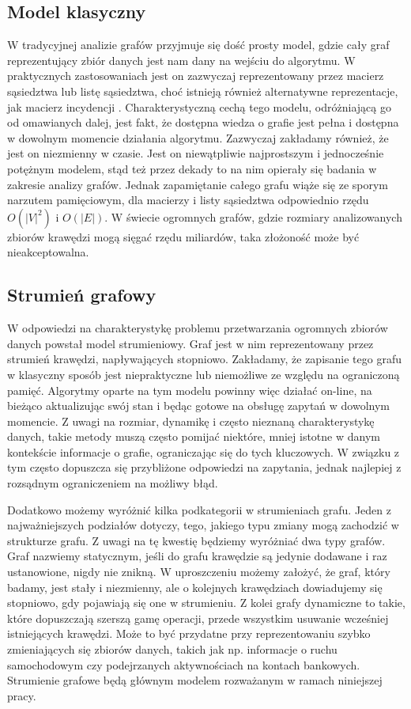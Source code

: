     \subsection{Model klasyczny}
        W tradycyjnej analizie grafów przyjmuje się dość prosty model, gdzie cały graf reprezentujący zbiór danych jest nam dany na wejściu do algorytmu. W praktycznych zastosowaniach jest on zazwyczaj reprezentowany przez macierz sąsiedztwa lub listę sąsiedztwa, choć istnieją również alternatywne reprezentacje, jak macierz incydencji \cite{Wilson_2015}. Charakterystyczną cechą tego modelu, odróżniającą go od omawianych dalej, jest fakt, że dostępna wiedza o grafie jest pełna i dostępna w dowolnym momencie działania algorytmu. Zazwyczaj zakładamy również, że jest on niezmienny w czasie. Jest on niewątpliwie najprostszym i jednocześnie potężnym modelem, stąd też przez dekady to na nim opierały się badania w zakresie analizy grafów. Jednak zapamiętanie całego grafu wiąże się ze sporym narzutem pamięciowym, dla macierzy i listy sąsiedztwa odpowiednio rzędu $O(|V|^2)$ i $O(|E|)$. W świecie ogromnych grafów, gdzie rozmiary analizowanych zbiorów krawędzi mogą sięgać rzędu miliardów, taka złożoność może być nieakceptowalna. 

    \subsection{Strumień grafowy}
        W odpowiedzi na charakterystykę problemu przetwarzania ogromnych zbiorów danych powstał model strumieniowy. Graf jest w nim reprezentowany przez strumień krawędzi, napływających stopniowo. Zakładamy, że zapisanie tego grafu w klasyczny sposób jest niepraktyczne lub niemożliwe ze względu na ograniczoną pamięć. Algorytmy oparte na tym modelu powinny więc działać on-line, na bieżąco aktualizując swój stan i będąc gotowe na obsługę zapytań w dowolnym momencie. Z uwagi na rozmiar, dynamikę i często nieznaną charakterystykę danych, takie metody muszą często pomijać niektóre, mniej istotne w danym kontekście informacje o grafie, ograniczając się do tych kluczowych. W związku z tym często dopuszcza się przybliżone odpowiedzi na zapytania, jednak najlepiej z rozsądnym ograniczeniem na możliwy błąd. 

        Dodatkowo możemy wyróżnić kilka podkategorii w strumieniach grafu. Jeden z najważniejszych podziałów dotyczy, tego, jakiego typu zmiany mogą zachodzić w strukturze grafu. Z uwagi na tę kwestię będziemy wyróżniać dwa typy grafów. Graf nazwiemy statycznym, jeśli do grafu krawędzie są jedynie dodawane i raz ustanowione, nigdy nie znikną. W uproszczeniu możemy założyć, że graf, który badamy, jest stały i niezmienny, ale o kolejnych krawędziach dowiadujemy się stopniowo, gdy pojawiają się one w strumieniu. Z kolei grafy dynamiczne to takie, które dopuszczają szerszą gamę operacji, przede wszystkim usuwanie wcześniej istniejących krawędzi. Może to być przydatne przy reprezentowaniu szybko zmieniających się zbiorów danych, takich jak np. informacje o ruchu samochodowym czy podejrzanych aktywnościach na kontach bankowych. Strumienie grafowe będą głównym modelem rozważanym w ramach niniejszej pracy. 

